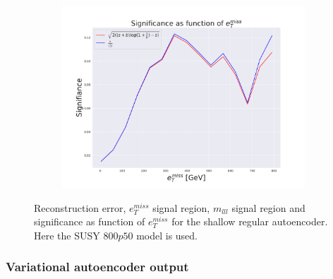 \begin{figure}[H]
    \hfill  
    \begin{subfigure}{.40\textwidth}
        \includegraphics[width=\textwidth]{Figures/AE_testing/small/2lep/significance_etmiss_800p0p050_-0.805852780573614.pdf}
        \caption{}
        \label{fig:AE_2lep_small_signi_800_3}
    \end{subfigure}
    \hfill      
    \caption[2lep shallow network | $800p50$ | AE | 3]{Reconstruction error, $e_T^{miss}$ signal region, $m_{lll}$ signal region and significance as function of 
    $e_T^{miss}$ for the shallow regular autoencoder. Here the SUSY $800p50$ model is used.}
    \label{fig:AE_2lep_small_rec_sig_signi_800_3}
\end{figure}















\subsubsection*{Variational autoencoder output}












